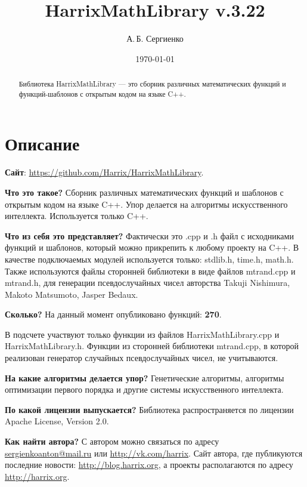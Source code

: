 \documentclass[a4paper,12pt]{article}
\title{HarrixMathLibrary v.3.22}
\author{А.\,Б. Сергиенко}
\date{\today}
\begin{document}


\maketitle

\begin{abstract}
Библиотека HarrixMathLibrary --- это сборник различных математических функций и функций-шаблонов с открытым кодом на языке C++.
\end{abstract}

\tableofcontents

\newpage

\section{Описание}

\textbf{Сайт}: \href{https://github.com/Harrix/HarrixMathLibrary}{https://github.com/Harrix/HarrixMathLibrary}.

\textbf{Что это такое?} Сборник различных математических функций и шаблонов с открытым кодом на языке C++. Упор делается на алгоритмы искусственного интеллекта. Используется только C++.

\textbf{Что из себя это представляет?} Фактически это .cpp и .h файл с исходниками функций и шаблонов, который можно прикрепить к любому проекту на C++. В качестве подключаемых модулей используется только: stdlib.h, time.h, math.h. Также используются файлы сторонней библиотеки в виде файлов mtrand.cpp и mtrand.h, для генерации псевдослучайных чисел авторства Takuji Nishimura, Makoto Matsumoto, Jasper Bedaux.

\textbf{Сколько?} На данный момент опубликовано функций: \textbf{270}.

В подсчете участвуют только функции из файлов HarrixMathLibrary.cpp и HarrixMathLibrary.h. Функции из сторонней библиотеки mtrand.cpp, в которой реализован генератор случайных псевдослучайных чисел, не учитываются.

\textbf{На какие алгоритмы делается упор?} Генетические алгоритмы, алгоритмы оптимизации первого порядка и другие системы искусственного интеллекта.

\textbf{По какой лицензии выпускается?} Библиотека распространяется по лицензии Apache License, Version 2.0.

\textbf{Как найти автора?} С автором можно связаться по адресу \href {mailto:sergienkoanton@mail.ru} {sergienkoanton@mail.ru} или  \href {http://vk.com/harrix} {http://vk.com/harrix}. Сайт автора, где публикуются последние новости: \href {http://blog.harrix.org} {http://blog.harrix.org}, а проекты располагаются по адресу \href {http://harrix.org} {http://harrix.org}.
\end{document}
